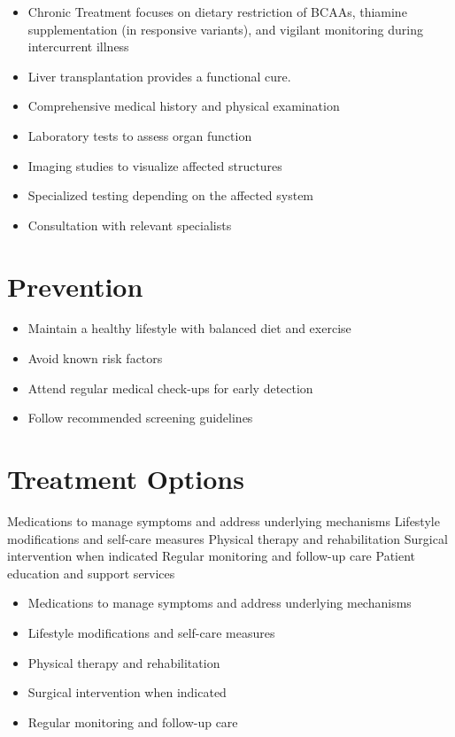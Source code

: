 \begin{itemize}[noitemsep]
  \item Chronic Treatment focuses on dietary restriction of BCAAs, thiamine supplementation (in responsive variants), and vigilant monitoring during intercurrent illness
  \item Liver transplantation provides a functional cure.
  \item Comprehensive medical history and physical examination
  \item Laboratory tests to assess organ function
  \item Imaging studies to visualize affected structures
  \item Specialized testing depending on the affected system
  \item Consultation with relevant specialists
\end{itemize}
\section{Prevention}
\begin{itemize}[noitemsep]
  \item Maintain a healthy lifestyle with balanced diet and exercise
  \item Avoid known risk factors
  \item Attend regular medical check-ups for early detection
  \item Follow recommended screening guidelines
\end{itemize}
\section{Treatment Options}
Medications to manage symptoms and address underlying mechanisms Lifestyle modifications and self-care measures Physical therapy and rehabilitation Surgical intervention when indicated Regular monitoring and follow-up care Patient education and support services

\begin{itemize}[noitemsep]
  \item Medications to manage symptoms and address underlying mechanisms
  \item Lifestyle modifications and self-care measures
  \item Physical therapy and rehabilitation
  \item Surgical intervention when indicated
  \item Regular monitoring and follow-up care
\end{itemize}
